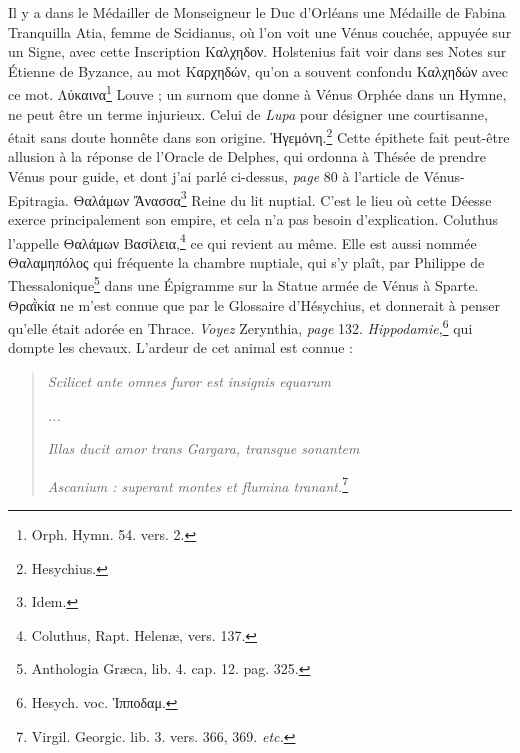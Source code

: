 \documentclass[a4paper, 11pt, oneside, polutonikogreek, french]{article}
\begin{document}
Il y a dans le Médailler de Monseigneur le Duc d'Orléans une Médaille de Fabina Tranquilla Atia, femme de Scidianus, où l'on voit une Vénus couchée, appuyée sur un Signe, avec cette Inscription Καλχηδον. Holstenius fait voir dans ses Notes sur Étienne de Byzance, au mot Καρχηδών, qu'on a souvent confondu Καλχηδών avec ce mot. Λύκαινα\footnote{Orph. Hymn. 54. vers. 2.} Louve ; un surnom que donne à Vénus Orphée dans un Hymne, ne peut être un terme injurieux. Celui de \emph{Lupa} pour désigner une courtisanne, était sans doute honnête dans son origine. Ἡγεμόνη.\footnote{Hesychius.} Cette épithete fait peut-être allusion à la réponse de l'Oracle de Delphes, qui ordonna à Thésée de prendre Vénus pour guide, et dont j'ai parlé ci-dessus, \emph{page} 80 à l'article de Vénus-Epitragia. Θαλάμων Ἄνασσα\footnote{Idem.} Reine du lit nuptial. C'est le lieu où cette Déesse exerce principalement son empire, et cela n'a pas besoin d'explication. Coluthus l'appelle Θαλάμων Βασίλεια,\footnote{Coluthus, Rapt. Helenæ, vers. 137.} ce qui revient au même. Elle est aussi nommée Θαλαμηπόλος qui fréquente la chambre nuptiale, qui s'y plaît, par Philippe de Thessalonique\footnote{Anthologia Græca, lib. 4. cap. 12. pag. 325.} dans une Épigramme sur la Statue armée de Vénus à Sparte. Θραῒκία ne m'est connue que par le Glossaire d'Hésychius, et donnerait à penser qu'elle était adorée en Thrace. \emph{Voyez} Zerynthia, \emph{page} 132. \emph{Hippodamie},\footnote{Hesych. voc. Ἱπποδαμ.} qui dompte les chevaux. L'ardeur de cet animal est connue :
\begin{quotation}
\emph{Scilicet ante omnes furor est insignis equarum}

\emph{...}

\emph{Illas ducit amor trans Gargara, transque sonantem}

\emph{Ascanium : superant montes et flumina tranant.}\footnote{Virgil. Georgic. lib. 3. vers. 366, 369. \emph{etc.}}
\end{quotation}
\end{document}
